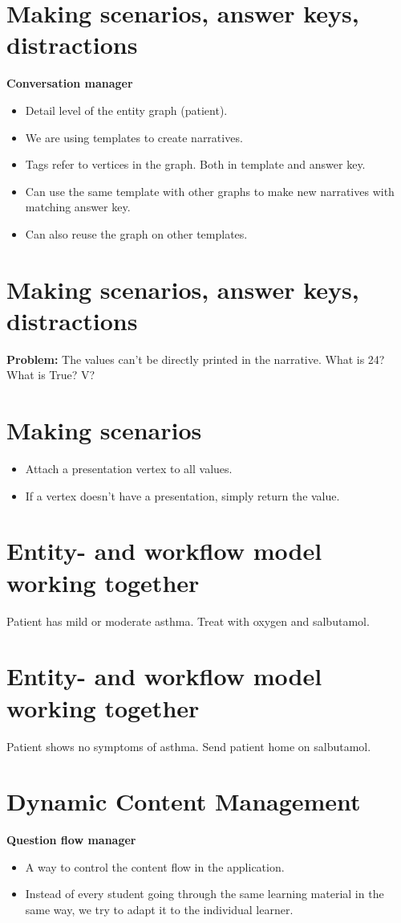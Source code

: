 \documentclass[20pt]{extarticle}
\begin{document}
	\section{Making scenarios, answer keys, distractions}
	\textbf{Conversation manager}
	\begin{itemize}
		\item Detail level of the entity graph (patient).
		\item We are using templates to create narratives.
		\item Tags refer to vertices in the graph. Both in template and answer key.
		\item Can use the same template with other graphs to make new narratives with matching answer key.
		\item Can also reuse the graph on other templates.
	\end{itemize}

	\section{Making scenarios, answer keys, distractions}
	\textbf{Problem:} The values can't be directly printed in the narrative. What is 24? What is True? V?

	\section{Making scenarios}
	\begin{itemize}
		\item Attach a presentation vertex to all values.
		\item If a vertex doesn't have a presentation, simply return the value.
	\end{itemize}

	\section{Entity- and workflow model working together}
	Patient has mild or moderate asthma. Treat with oxygen and salbutamol.

	\section{Entity- and workflow model working together}
	Patient shows no symptoms of asthma. Send patient home on salbutamol.

	\section{Dynamic Content Management}
	\textbf{Question flow manager}
	\begin{itemize}
		\item A way to control the content flow in the application.
		\item Instead of every student going through the same learning material in the same way, we try to adapt it to the individual learner.
	\end{itemize}
\end{document}
